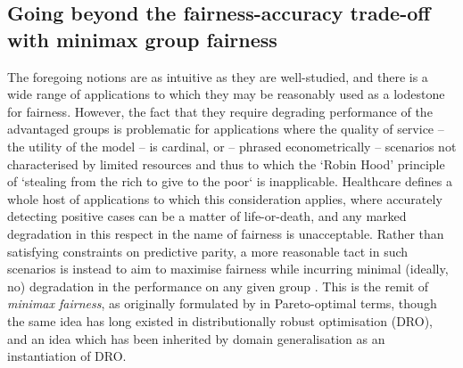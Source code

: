 \subsection{Going beyond the fairness-accuracy trade-off with minimax group
fairness}\label{ssec:minimax-fairness}
The foregoing notions are as intuitive as they are well-studied, and there is a wide
range of applications to which they may be reasonably used as a lodestone for fairness.
%
However, the fact that they require degrading performance of the advantaged groups is problematic
for applications where the quality of service -- the utility of the model -- is cardinal, or --
phrased econometrically -- scenarios not characterised by limited resources  and thus to which the
`Robin Hood' principle of `stealing from the rich to give to the poor` is inapplicable.
%
Healthcare defines a whole host of applications to which this consideration applies, where
accurately detecting positive cases can be a matter of life-or-death, and any marked degradation in
this respect in the name of fairness is unacceptable. 
%
Rather than satisfying constraints on predictive parity, a more reasonable tact in such scenarios
is instead to aim to maximise fairness while incurring minimal (ideally, no) degradation in the
performance on any given group \citep{ustun2019fairness}.
%
This is the remit of \emph{minimax fairness}, as originally formulated by
\citep{martinez2020minimax} in Pareto-optimal terms, though the same idea has long existed in
distributionally robust optimisation (DRO), and an idea which has been inherited by domain
generalisation as an instantiation of DRO. 
%

